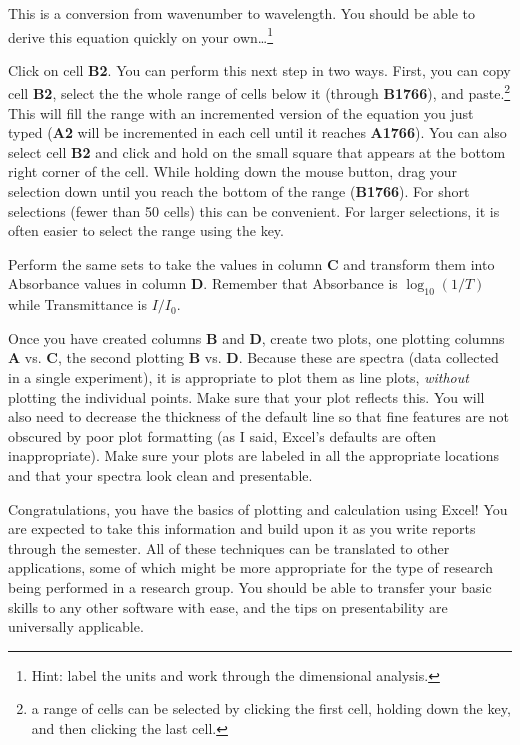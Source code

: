 \documentclass[nobib,nofonts,nols,nohyper]{tufte-handout}
\begin{document}
This is a conversion from wavenumber to wavelength. 
You should be able to derive this equation quickly on your own…\footnote{Hint: label the units and work through the dimensional analysis.}

Click on cell \textbf{B2}. 
You can perform this next step in two ways. 
First, you can copy cell \textbf{B2}, select the the whole range of cells below it (through \textbf{B1766}), and paste.\footnote{a range of cells can be selected by clicking the first cell, holding down the  key, and then clicking the last cell.} 
This will fill the range with an incremented version of the equation you just typed (\textbf{A2} will be incremented in each cell until it reaches \textbf{A1766}). 
You can also select cell \textbf{B2} and click and hold on the small square that appears at the bottom right corner of the cell. 
While holding down the mouse button, drag your selection down until you reach the bottom of the range (\textbf{B1766}). 
For short selections (fewer than 50 cells) this can be convenient. 
For larger selections, it is often easier to select the range using the  key.

Perform the same sets to take the values in column \textbf{C} and transform them into Absorbance values in column \textbf{D}. 
Remember that Absorbance is \(\log_{10}(1/T)\) while Transmittance is \(I / I_0\).

Once you have created columns \textbf{B} and \textbf{D}, create two plots, one plotting columns \textbf{A} vs. \textbf{C}, the second plotting \textbf{B} vs. \textbf{D}. 
Because these are spectra (data collected in a single experiment), it is appropriate to plot them as line plots, \emph{without} plotting the individual points. 
Make sure that your plot reflects this. 
You will also need to decrease the thickness of the default line so that fine features are not obscured by poor plot formatting (as I said, Excel's defaults are often inappropriate). 
Make sure your plots are labeled in all the appropriate locations and that your spectra look clean and presentable.

Congratulations, you have the basics of plotting and calculation using Excel! 
You are expected to take this information and build upon it as you write reports through the semester. 
All of these techniques can be translated to other applications, some of which might be more appropriate for the type of research being performed in a research group. 
You should be able to transfer your basic skills to any other software with ease, and the tips on presentability are universally applicable.
\end{document}
